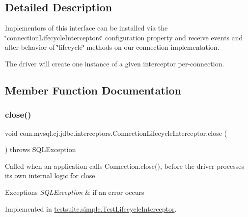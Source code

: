 \subsection{Detailed Description}
Implementors of this interface can be installed via the \char`\"{}connection\+Lifecycle\+Interceptors\char`\"{} configuration property and receive events and alter behavior of \char`\"{}lifecycle\char`\"{} methods on our connection implementation.

The driver will create one instance of a given interceptor per-\/connection. 

\subsection{Member Function Documentation}
\mbox{\label{interfacecom_1_1mysql_1_1cj_1_1jdbc_1_1interceptors_1_1_connection_lifecycle_interceptor_abb75c2ea1017850c63b6783a657cec4c}} 
\subsubsection{\texorpdfstring{close()}{close()}}
{\footnotesize\ttfamily void com.\+mysql.\+cj.\+jdbc.\+interceptors.\+Connection\+Lifecycle\+Interceptor.\+close (\begin{DoxyParamCaption}{ }\end{DoxyParamCaption}) throws S\+Q\+L\+Exception}

Called when an application calls Connection.\+close(), before the driver processes its own internal logic for close.


\begin{DoxyExceptions}{Exceptions}
{\em S\+Q\+L\+Exception} & if an error occurs \\
\hline
\end{DoxyExceptions}


Implemented in \mbox{\hyperlink{classtestsuite_1_1simple_1_1_test_lifecycle_interceptor_ace03032cbe6f9aae94a05ae442466d2d}{testsuite.\+simple.\+Test\+Lifecycle\+Interceptor}}.

